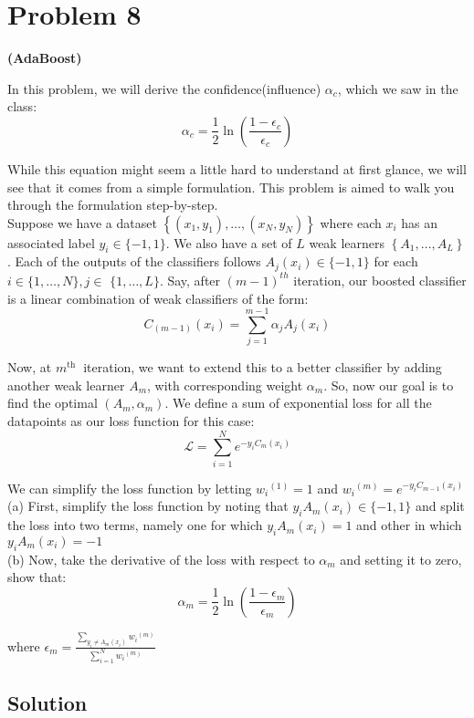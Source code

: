 \section*{Problem 8}

\textbf{(AdaBoost)}

In this problem, we will derive the confidence(influence) \( \alpha_{c} \), which we saw in the class:
\[
    \alpha_{c}=\frac{1}{2} \ln \left(\frac{1-\epsilon_{c}}{\epsilon_{c}}\right)
\]

While this equation might seem a little hard to understand at first glance, we will see that it comes from a simple formulation. This problem is aimed to walk you through the formulation step-by-step.\\
Suppose we have a dataset \( \left\{\left(x_{1}, y_{1}\right), \ldots,\left(x_{N}, y_{N}\right)\right\} \) where each \( x_{i} \) has an associated label \( y_{i} \in\{-1,1\} \). We also have a set of \( L \) weak learners \( \left\{A_{1}, \ldots, A_{L}\right\} \). Each of the outputs of the classifiers follows \( A_{j}\left(x_{i}\right) \in\{-1,1\} \) for each \( i \in\{1, \ldots, N\}, j \in \) \( \{1, \ldots, L\} \). Say, after \( (m-1)^{t h} \) iteration, our boosted classifier is a linear combination of weak classifiers of the form:
\[
    C_{(m-1)}\left(x_{i}\right)=\sum_{j=1}^{m-1} \alpha_{j} A_{j}\left(x_{i}\right)
\]

Now, at \( m^{\text {th }} \) iteration, we want to extend this to a better classifier by adding another weak learner \( A_{m} \), with corresponding weight \( \alpha_{m} \). So, now our goal is to find the optimal \( \left(A_{m}, \alpha_{m}\right) \). We define a sum of exponential loss for all the datapoints as our loss function for this case:
\[
    \mathcal{L}=\sum_{i=1}^{N} e^{-y_{i} C_{m}\left(x_{i}\right)}
\]

We can simplify the loss function by letting \( w_{i}{ }^{(1)}=1 \) and \( w_{i}{ }^{(m)}=e^{-y_{i} C_{m-1}\left(x_{i}\right)} \)\\
(a) First, simplify the loss function by noting that \( y_{i} A_{m}\left(x_{i}\right) \in\{-1,1\} \) and split the loss into two terms, namely one for which \( y_{i} A_{m}\left(x_{i}\right)=1 \) and other in which \( y_{i} A_{m}\left(x_{i}\right)=-1 \)\\
(b) Now, take the derivative of the loss with respect to \( \alpha_{m} \) and setting it to zero, show that:
\[
    \alpha_{m}=\frac{1}{2} \ln \left(\frac{1-\epsilon_{m}}{\epsilon_{m}}\right)
\]

where \( \epsilon_{m}=\frac{\sum_{y_{i} \neq A_{m}\left(x_{i}\right)} w_{i}{ }^{(m)}}{\sum_{i=1}^{N} w_{i}{ }^{(m)}} \)

\subsection*{Solution}
